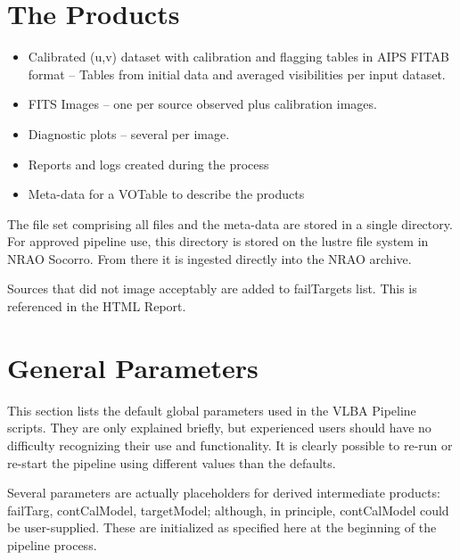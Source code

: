\documentclass[11pt]{article}
\begin{document}
\section {The Products}

\begin{itemize}
\item Calibrated (u,v) dataset with calibration and flagging tables in
AIPS FITAB format -- Tables from initial data and averaged
visibilities per input dataset. 
\item FITS Images -- one per source observed plus calibration images.
\item Diagnostic plots -- several per image.
\item Reports and logs created during the process
\item Meta-data for a VOTable to describe the products
\end{itemize}

The file set comprising all files and the meta-data are stored in a single
directory.  For approved pipeline use, this directory is stored on the lustre
file system in NRAO Socorro.  From there it is ingested directly into the NRAO
archive.

Sources that did not image acceptably are added to failTargets list.  This is
referenced in the HTML Report.

\clearpage
\appendix
\section{General Parameters}

This section lists the default global parameters used in the VLBA Pipeline
scripts.  They are only explained briefly, but experienced users should have no
difficulty recognizing their use and functionality.  It is clearly possible to
re-run or re-start the pipeline using different values than the defaults.

Several parameters are actually placeholders for derived intermediate products:
failTarg, contCalModel, targetModel; although, in principle, contCalModel could
be user-supplied.  These are initialized as specified here at the beginning of
the pipeline process.
\end{document}
